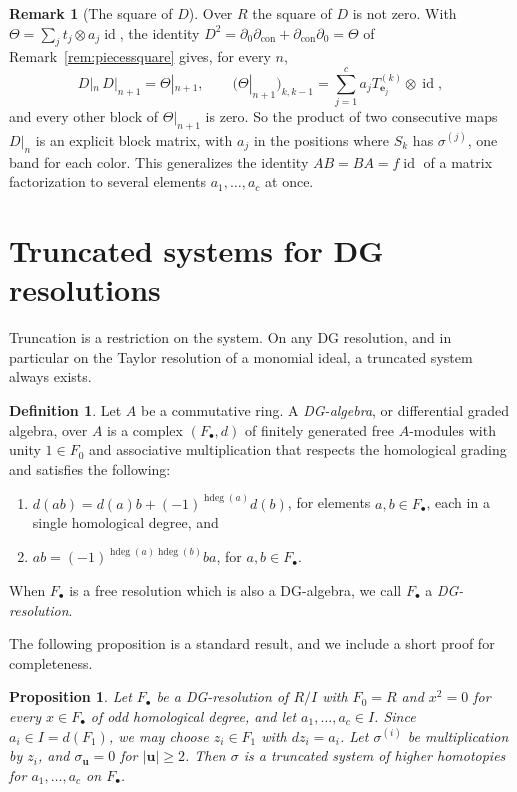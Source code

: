 \documentclass[12pt]{amsart}
\theoremstyle{plain}
\newtheorem{proposition}[theorem]{Proposition}
\theoremstyle{definition}
\newtheorem{definition}[theorem]{Definition}
\newtheorem{remark}[theorem]{Remark}
\newcommand{\dcon}{\partial_{\mathrm{con}}}
\newcommand{\F}{ {F_\bullet} }
\newcommand{\id}{\operatorname{id}}
\newcommand{\hdeg}{\operatorname{hdeg}}
\begin{document}
\begin{remark}[The square of $D$]\label{rem:hmf}
    Over $R$ the square of $D$ is not zero. With $\Theta = \sum_j t_j \otimes a_j \id$, the identity $D^2 = \partial_0 \dcon + \dcon \partial_0 = \Theta$ of Remark~\ref{rem:piecessquare} gives, for every $n$,
    \[
        D|_{n}\, D|_{n+1} = \Theta|_{n+1}, \qquad \bigl(\Theta|_{n+1}\bigr)_{k,k-1} = \sum_{j=1}^{c} a_j T^{(k)}_{\boldsymbol{e}_j} \otimes \id ,
    \]
    and every other block of $\Theta|_{n+1}$ is zero. So the product of two consecutive maps $D|_n$ is an explicit block matrix, with $a_j$ in the positions where $S_k$ has $\sigma^{(j)}$, one band for each color. This generalizes the identity $AB = BA = f \id$ of a matrix factorization to several elements $a_1, \dots, a_c$ at once.
\end{remark}

\section{Truncated systems for DG resolutions}\label{sec:sobieska}

Truncation is a restriction on the system. On any DG resolution, and in particular on the Taylor resolution of a monomial ideal, a truncated system always exists.

\begin{definition}\label{def:dg} \cite[Section 1.3]{AvramovSixLectures}
Let $A$ be a commutative ring. A \emph{DG-algebra}, or differential graded algebra, over $A$ is a complex $(\F,d)$ of finitely generated free $A$-modules with unity $1 \in F_0$ and associative multiplication that respects the homological grading and satisfies the following:
    \begin{enumerate}
\item $d(ab)=d(a)b+(-1)^{\hdeg(a)}d(b)$, for elements $a,b \in \F$, each in a single homological degree, and
\item $ab=(-1)^{\hdeg(a)\hdeg(b)}ba$, for $a,b \in \F$.
\end{enumerate}
When $\F$ is a free resolution which is also a DG-algebra, we call $\F$ a \emph{DG-resolution}.
\end{definition}

The following proposition is a standard result, and we include a short proof for completeness.
\begin{proposition}\label{prop:dgtrunc}
    Let $\F$ be a DG-resolution of $R/I$ with $F_0 = R$ and $x^2 = 0$ for every $x \in \F$ of odd homological degree, and let $a_1, \dots, a_c \in I$. Since $a_i \in I = d(F_1)$, we may choose $z_i \in F_1$ with $d z_i = a_i$. Let $\sigma^{(i)}$ be multiplication by $z_i$, and $\sigma_{\boldsymbol{u}} = 0$ for $|\boldsymbol{u}| \ge 2$. Then $\sigma$ is a truncated system of higher homotopies for $a_1, \dots, a_c$ on $\F$.
\end{proposition}
\end{document}
